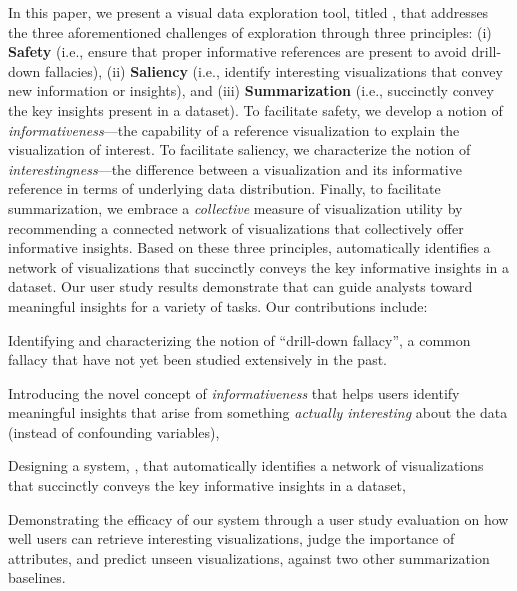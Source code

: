 \par In this paper, we present a visual data exploration tool, titled \system, that addresses the three aforementioned challenges of exploration through three principles: (i) \textbf{Safety} (i.e., ensure that proper informative references are present to avoid drill-down fallacies), (ii) \textbf{Saliency} (i.e., identify interesting visualizations that convey new information or insights), and (iii) \textbf{Summarization} (i.e., succinctly convey the key insights present in a dataset). To facilitate safety, we develop a notion of \emph{informativeness}---the capability of a reference visualization to explain the visualization of interest. To facilitate saliency, we characterize the notion of \emph{interestingness}---the difference between a visualization and its informative reference in terms of underlying data distribution. Finally, to facilitate summarization, we embrace a \emph{collective} measure of visualization utility by recommending a connected network of visualizations that collectively offer informative insights. Based on these three principles, \system automatically identifies a network of visualizations that succinctly conveys the key informative insights in a dataset. Our user study results demonstrate that \system can guide analysts toward meaningful insights for a variety of tasks. Our contributions include:
\begin{denselist}
\item Identifying and characterizing the notion of ``drill-down fallacy'', a common fallacy that have not yet been studied extensively in the past.
\item Introducing the novel concept of \emph{informativeness} that helps users identify meaningful insights that arise from something \textit{actually interesting} about the data (instead of confounding variables),
\item Designing a system, \system, that automatically identifies a network of visualizations that succinctly conveys the key informative insights in a dataset,
\item Demonstrating the efficacy of our system through a user study evaluation on how well users can retrieve interesting visualizations, judge the importance of attributes, and predict unseen visualizations, against two other summarization baselines.
\end{denselist}